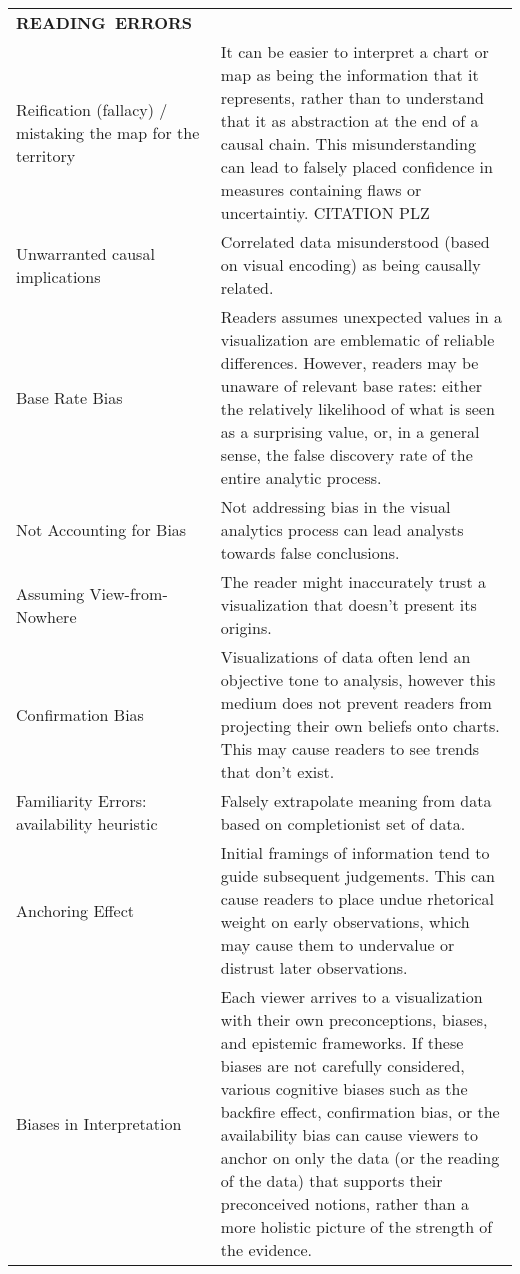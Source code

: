 \begin{longtable}{p{3cm}p{14cm}}
  \hbox{\textbf{READING ERRORS}}& \\
   \rowcolor{colord}Reification (fallacy) / mistaking the map for the territory  & It can be easier to interpret a chart or map as being the information that it represents, rather than to understand that it as abstraction at the end of a causal chain. This misunderstanding can lead to falsely placed confidence in measures containing flaws or uncertaintiy.  CITATION PLZ\\
 \rowcolor{colord-opaque}Unwarranted causal implications & Correlated data misunderstood (based on visual encoding) as being causally related. \cite{xiong2019illusion, few2019loom}\\
 \rowcolor{colord}Base Rate Bias & Readers assumes unexpected values in a visualization are emblematic of reliable differences. However, readers may be unaware of relevant base rates: either the relatively likelihood of what is seen as a surprising value, or, in a general sense, the false discovery rate of the entire analytic process.  \cite{correll2016surprise,pu2018garden, zgraggen2018investigating}\\
 \rowcolor{colord-opaque}Not Accounting for Bias & Not addressing bias in the visual analytics process can lead analysts towards false conclusions. \cite{wall2017warning}\\
 \rowcolor{colord}Assuming View-from-Nowhere & The reader might inaccurately trust a visualization that doesn't present its origins. \cite{dignazio2019draft, d2016feminist}\\
 \rowcolor{colord-opaque}Confirmation Bias & Visualizations of data often lend an objective tone to analysis, however this medium does not prevent readers from projecting their own beliefs onto charts. This may cause readers to see trends that don't exist. \cite{valdez2017framework, few2019loom}\\
 \rowcolor{colord}Familiarity Errors: availability heuristic & Falsely extrapolate meaning from data based on completionist set of data. \cite{few2019loom}\\
 \rowcolor{colord-opaque}Anchoring Effect  & Initial framings of information tend to guide subsequent judgements. This can cause readers to place undue rhetorical weight on early observations, which may cause them to undervalue or distrust later observations.  \cite{ritchie2019lie, hullman2011visualization}\\
 \rowcolor{colord}Biases in Interpretation & Each viewer arrives to a visualization with their own preconceptions, biases, and epistemic frameworks. If these biases are not carefully considered, various cognitive biases such as the backfire effect, confirmation bias, or the availability bias can cause viewers to anchor on only the data (or the reading of the data) that supports their preconceived notions, rather than a more holistic picture of the strength of the evidence. \cite{dignazio2019draft, d2016feminist,valdez2017framework, few2019loom,wall2017warning}\\
\end{longtable}
\label{table:mirage-table}
